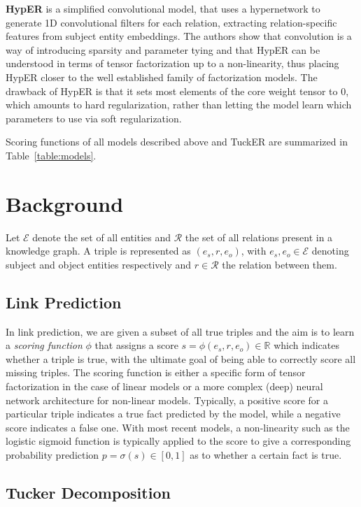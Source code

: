 \documentclass[11pt,a4paper]{article}
\begin{document}
\noindent\textbf{HypER} \cite{balazevic2019hypernetwork} is a simplified convolutional model, that uses a hypernetwork to generate 1D convolutional filters for each relation, extracting relation-specific features from subject entity embeddings. The authors show that convolution is a way of introducing sparsity and parameter tying and that HypER can be understood in terms of tensor factorization up to a non-linearity, thus placing  HypER closer to the well established family of factorization models. The drawback of HypER is that it sets most elements of the core weight tensor to 0, which amounts to hard regularization, rather than letting the model learn which parameters to use via soft regularization. 

Scoring functions of all models described above and TuckER are summarized in Table~\ref{table:models}.

\section{Background}

Let $\mathcal{E}$ denote the set of all entities and $\mathcal{R}$ the set of all relations present in a knowledge graph. A triple is represented as $(e_s, r, e_o)$, with $e_s, e_o \in \mathcal{E}$ denoting subject and object entities respectively and $r \in \mathcal{R}$ the relation between them. 

\subsection{Link Prediction}

In link prediction, we are given a subset of all true triples and the aim is to learn a \textit{scoring function} $\phi$ that assigns a score $s = \phi(e_s, r, e_o) \in \mathbb{R}$ which indicates whether a triple is true, with the ultimate goal of being able to correctly score all missing triples. The scoring function is either a specific form of tensor factorization in the case of linear models or a more complex (deep) neural network architecture for non-linear models. Typically, a positive score for a particular triple indicates a true fact predicted by the model, while a negative score indicates a false one. With most recent models, a non-linearity such as the logistic sigmoid function is typically applied to the score to give a corresponding probability prediction $p = \sigma(s) \in [0, 1]$ as to whether a certain fact is true. 

 
 \subsection{Tucker Decomposition} \label{tuckerdecomp}
 
\end{document}
